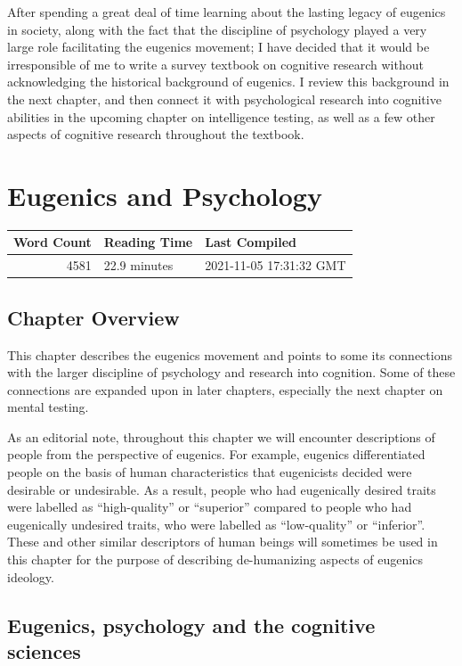 \documentclass[
  oneside,
  12pt]{crumpbook}
\begin{document}
After spending a great deal of time learning about the lasting legacy of eugenics in society, along with the fact that the discipline of psychology played a very large role facilitating the eugenics movement; I have decided that it would be irresponsible of me to write a survey textbook on cognitive research without acknowledging the historical background of eugenics. I review this background in the next chapter, and then connect it with psychological research into cognitive abilities in the upcoming chapter on intelligence testing, as well as a few other aspects of cognitive research throughout the textbook.

\hypertarget{eugenics-and-psychology}{%
\chapter{Eugenics and Psychology}\label{eugenics-and-psychology}}

\begin{tabular}{r|l|l}
\hline
Word Count & Reading Time & Last Compiled\\
\hline
4581 & 22.9 minutes & 2021-11-05 17:31:32 GMT\\
\hline
\end{tabular}

\hypertarget{chapter-overview-2}{%
\section{Chapter Overview}\label{chapter-overview-2}}

This chapter describes the eugenics movement and points to some its connections with the larger discipline of psychology and research into cognition. Some of these connections are expanded upon in later chapters, especially the next chapter on mental testing.

As an editorial note, throughout this chapter we will encounter descriptions of people from the perspective of eugenics. For example, eugenics differentiated people on the basis of human characteristics that eugenicists decided were desirable or undesirable. As a result, people who had eugenically desired traits were labelled as ``high-quality'' or ``superior'' compared to people who had eugenically undesired traits, who were labelled as ``low-quality'' or ``inferior''. These and other similar descriptors of human beings will sometimes be used in this chapter for the purpose of describing de-humanizing aspects of eugenics ideology.

\hypertarget{eugenics-psychology-and-the-cognitive-sciences}{%
\section{Eugenics, psychology and the cognitive sciences}\label{eugenics-psychology-and-the-cognitive-sciences}}
\end{document}
